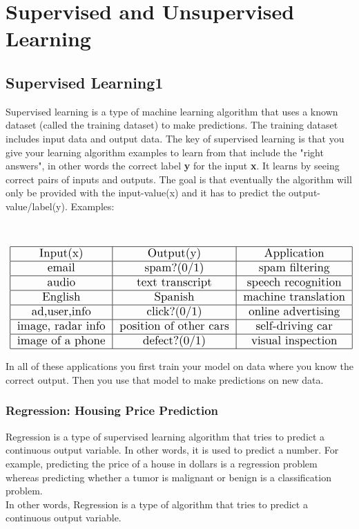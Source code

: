 \section{Supervised and Unsupervised Learning}

\subsection{Supervised Learning1}
Supervised learning is a type of machine learning algorithm that uses a known dataset (called the training dataset) to make predictions. The training dataset includes input data and output data. The key of supervised learning is that you give your learning algorithm examples to learn from that include the "right answers", in other words the correct label \textbf{y} for the input \textbf{x}.
It learns by seeing correct pairs of inputs and outputs.  The goal is that eventually the algorithm will only be provided with the input-value(x) and it has to predict the output-value/label(y). 
Examples: \\ \\ \\

\begin{align*}
    \scalebox{1.3}{
\begin{tabular}{|c|c|c|}
    \hline
    Input(x) & Output(y) & Application \\
    \hline
    email & spam?(0/1) & spam filtering \\
    \hline
    audio & text transcript & speech recognition \\
    \hline
    English & Spanish & machine translation \\
    \hline
    ad,user,info & click?(0/1) & online advertising \\
    \hline
    image, radar info & position of other cars & self-driving car \\
    \hline
    image of a phone & defect?(0/1) & visual inspection \\
    \hline
\end{tabular}}
\end{align*}

In all of these applications you first train your model on data where you know the correct output. Then you use that model to make predictions on new data. \\

\subsubsection*{Regression: Housing Price Prediction}
Regression is a type of supervised learning algorithm that tries to predict a continuous output variable. In other words, it is used to predict a number. For example, predicting the price of a house in dollars is a regression problem whereas predicting whether a tumor is malignant or benign is a classification problem. \\
In other words, Regression is a type of algorithm that tries to predict a continuous output variable. 

